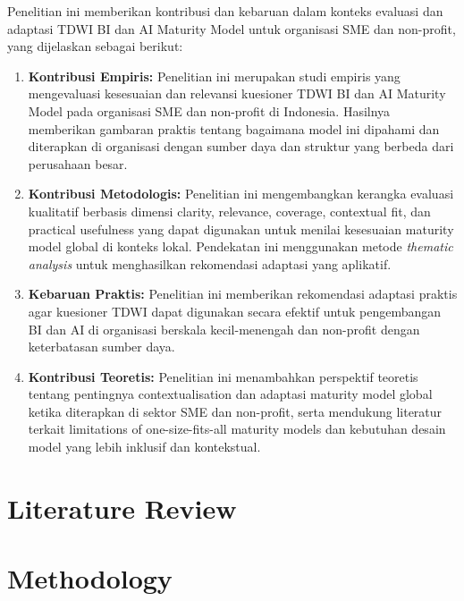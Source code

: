 \documentclass[conference]{IEEEtran}
\begin{document}
Penelitian ini memberikan kontribusi dan kebaruan dalam konteks evaluasi dan adaptasi TDWI BI dan AI Maturity Model untuk organisasi SME dan non-profit, yang dijelaskan sebagai berikut:

\begin{enumerate}
	\item[\textbf{K1.}] \textbf{Kontribusi Empiris:}  
	Penelitian ini merupakan studi empiris yang mengevaluasi kesesuaian dan relevansi kuesioner TDWI BI dan AI Maturity Model pada organisasi SME dan non-profit di Indonesia. Hasilnya memberikan gambaran praktis tentang bagaimana model ini dipahami dan diterapkan di organisasi dengan sumber daya dan struktur yang berbeda dari perusahaan besar.
	
	\item[\textbf{K2.}] \textbf{Kontribusi Metodologis:}  
	Penelitian ini mengembangkan kerangka evaluasi kualitatif berbasis dimensi clarity, relevance, coverage, contextual fit, dan practical usefulness yang dapat digunakan untuk menilai kesesuaian maturity model global di konteks lokal. Pendekatan ini menggunakan metode \textit{thematic analysis} untuk menghasilkan rekomendasi adaptasi yang aplikatif.
	
	\item[\textbf{K3.}] \textbf{Kebaruan Praktis:}  
	Penelitian ini memberikan rekomendasi adaptasi praktis agar kuesioner TDWI dapat digunakan secara efektif untuk pengembangan BI dan AI di organisasi berskala kecil-menengah dan non-profit dengan keterbatasan sumber daya.
	
	\item[\textbf{K4.}] \textbf{Kontribusi Teoretis:}  
	Penelitian ini menambahkan perspektif teoretis tentang pentingnya contextualisation dan adaptasi maturity model global ketika diterapkan di sektor SME dan non-profit, serta mendukung literatur terkait limitations of one-size-fits-all maturity models dan kebutuhan desain model yang lebih inklusif dan kontekstual.
\end{enumerate}




\section{Literature Review}
\label{sec:literature_review}


\section{Methodology}
\label{sec:methodology}
\end{document}

